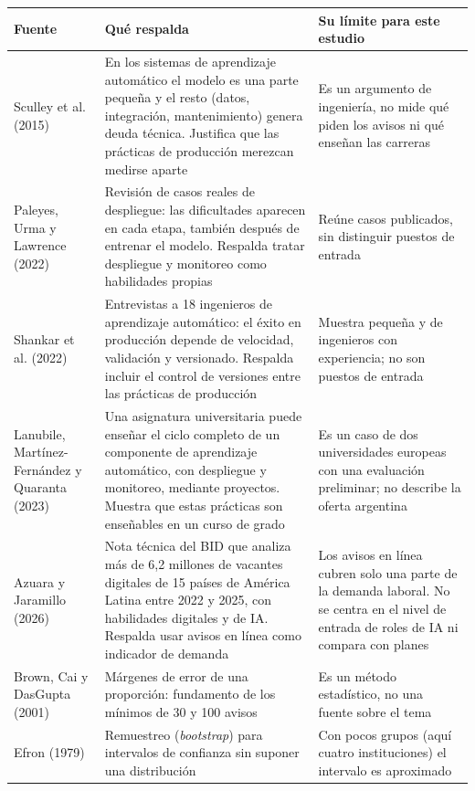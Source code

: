 \documentclass[11pt,a4paper]{article}
\begin{document}
\begin{table}[H]
\centering\small
\begin{tabularx}{\textwidth}{L{3.1cm} X X}
\toprule
{}\textbf{Fuente} & \textbf{Qué respalda} & \textbf{Su límite para este estudio}\\
\midrule
Sculley et al. (2015) \cite{sculley2015} & En los sistemas de aprendizaje automático el modelo es una parte pequeña y el resto (datos, integración, mantenimiento) genera deuda técnica. Justifica que las prácticas de producción merezcan medirse aparte & Es un argumento de ingeniería, no mide qué piden los avisos ni qué enseñan las carreras\\
Paleyes, Urma y Lawrence (2022) \cite{paleyes2022} & Revisión de casos reales de despliegue: las dificultades aparecen en cada etapa, también después de entrenar el modelo. Respalda tratar despliegue y monitoreo como habilidades propias & Reúne casos publicados, sin distinguir puestos de entrada\\
Shankar et al. (2022) \cite{shankar2022} & Entrevistas a 18 ingenieros de aprendizaje automático: el éxito en producción depende de velocidad, validación y versionado. Respalda incluir el control de versiones entre las prácticas de producción & Muestra pequeña y de ingenieros con experiencia; no son puestos de entrada\\
Lanubile, Martínez-Fernández y Quaranta (2023) \cite{lanubile2023} & Una asignatura universitaria puede enseñar el ciclo completo de un componente de aprendizaje automático, con despliegue y monitoreo, mediante proyectos. Muestra que estas prácticas son enseñables en un curso de grado & Es un caso de dos universidades europeas con una evaluación preliminar; no describe la oferta argentina\\
Azuara y Jaramillo (2026) \cite{azuara2026} & Nota técnica del BID que analiza más de 6,2 millones de vacantes digitales de 15 países de América Latina entre 2022 y 2025, con habilidades digitales y de IA. Respalda usar avisos en línea como indicador de demanda & Los avisos en línea cubren solo una parte de la demanda laboral. No se centra en el nivel de entrada de roles de IA ni compara con planes\\
Brown, Cai y DasGupta (2001) \cite{brown2001} & Márgenes de error de una proporción: fundamento de los mínimos de 30 y 100 avisos & Es un método estadístico, no una fuente sobre el tema\\
Efron (1979) \cite{efron1979} & Remuestreo (\emph{bootstrap}) para intervalos de confianza sin suponer una distribución & Con pocos grupos (aquí cuatro instituciones) el intervalo es aproximado\\

\end{tabularx}
\end{table}
\end{document}
